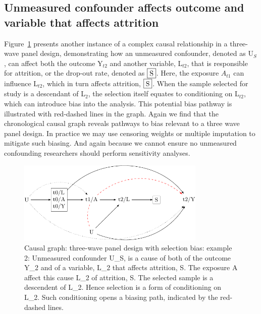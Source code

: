 \documentclass[
  singlecolumn]{report}
\begin{document}
\hypertarget{unmeasured-confounder-affects-outcome-and-variable-that-affects-attrition}{%
\subsection{Unmeasured confounder affects outcome and variable that
affects
attrition}\label{unmeasured-confounder-affects-outcome-and-variable-that-affects-attrition}}

Figure~\ref{fig-dag-8-2} presents another instance of a complex causal
relationship in a three-wave panel design, demonstrating how an
unmeasured confounder, denoted as U\(_S\), can affect both the outcome
Y\(_{t2}\) and another variable, L\(_{t2}\), that is responsible for
attrition, or the drop-out rate, denoted as \(\framebox{S}\). Here, the
exposure \(A_{t1}\) can influence L\(_{t2}\), which in turn affects
attrition, \(\framebox{S}\). When the sample selected for study is a
descendant of L\(_2\), the selection itself equates to conditioning on
L\(_{t2}\), which can introduce bias into the analysis. This potential
bias pathway is illustrated with red-dashed lines in the graph. Again we
find that the chronological causal graph reveals pathways to bias
relevant to a three wave panel design. In practice we may use censoring
weights or multiple imputation to mitigate such biasing. And again
because we cannot ensure no unmeasured confounding researchers should
perform sensitivity analyses.

\begin{figure}

{\centering \includegraphics[width=0.8\textwidth,height=\textheight]{causal-dags_files/figure-pdf/fig-dag-8-2-1.pdf}

}

\caption{\label{fig-dag-8-2}Causal graph: three-wave panel design with
selection bias: example 2: Unmeasured confounder U\_S, is a cause of
both of the outcome Y\_2 and of a variable, L\_2 that affects attrition,
S. The exposure A affect this cause L\_2 of attrition, S. The selected
sample is a descendent of L\_2. Hence selection is a form of
conditioning on L\_2. Such conditioning opens a biasing path, indicated
by the red-dashed lines.}

\end{figure}
\end{document}
